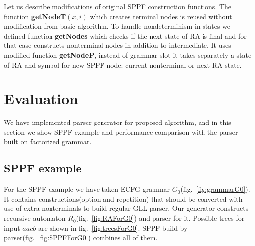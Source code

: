 \documentclass[runningheads,a4paper]{llncs}
\begin{document}
Let us describe modifications of original SPPF construction functions.
The function \textbf{getNodeT$(x,i)$} which creates terminal nodes is reused without modification from basic algorithm.
To handle nondeterminism in states we defined function \textbf{getNodes} which checks if the next state of RA
is final and for that case constructs nonterminal nodes in addition to intermediate.
It uses modified function \textbf{getNodeP}, instead of grammar slot it takes separately a 
state of RA and symbol for new SPPF node: current nonterminal or next RA state.




\section{Evaluation}

We have implemented parser generator for proposed algorithm, and
in this section we show SPPF example and performance comparison 
with the parser built on factorized grammar.

\subsection{SPPF example}

For the SPPF example we have taken ECFG grammar $G_0$(fig.~\ref{fig:grammarG0}).
It contains constructions(option and repetition) that should be converted with
use of extra nonterminals to build regular GLL parser. Our generator constructs
recursive automaton $R_0$(fig.~\ref{fig:RAForG0}) and parser for it.
Possible trees for input $ aacb $ are shown in fig.~\ref{fig:treesForG0}.
SPPF build by parser(fig.~\ref{fig:SPPFForG0}) combines all of them.
\end{document}
